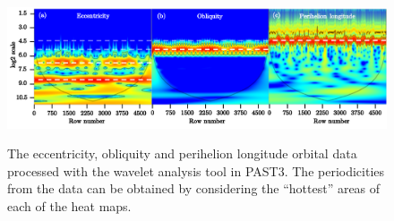 \documentclass[12pt, onecolumn]{revtex4}    %
\begin{document}
\begin{figure}[!h]
\begin{center}
\includegraphics[width=16cm]{figures/wa_orbital_data}
\caption[]{The eccentricity, obliquity and perihelion longitude orbital data processed with the wavelet analysis tool in PAST3. The periodicities from the data can be obtained by considering the ``hottest'' areas of each of the heat maps. }
\vspace{-3ex}
\label{fig:d18o_redfit}
\end{center}
\end{figure}
\end{document}
